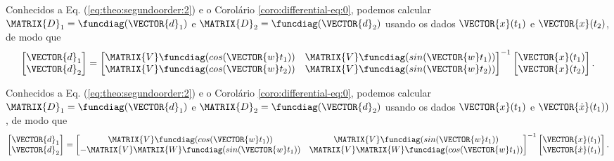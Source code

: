 \begin{corollary}
\label{coro:differential-eq:1}
Conhecidos a Eq. (\ref{eq:theo:segundoorder:2}) e o Corolário \ref{coro:differential-eq:0},
podemos calcular
$\MATRIX{D}_1=\funcdiag(\VECTOR{d}_1)$ e $\MATRIX{D}_2=\funcdiag(\VECTOR{d}_2)$ 
usando os dados $\VECTOR{x}(t_1)$ e $\VECTOR{x}(t_2)$, de modo que
\begin{equation}\label{eq:coro:differential-eq:1:a}
\begin{bmatrix}
\VECTOR{d}_1\\
\VECTOR{d}_2
\end{bmatrix}
=
\begin{bmatrix}
\MATRIX{V} \funcdiag(cos(\VECTOR{w}t_1)) &  \MATRIX{V} \funcdiag(sin(\VECTOR{w}t_1))\\
\MATRIX{V} \funcdiag(cos(\VECTOR{w}t_2)) &  \MATRIX{V} \funcdiag(sin(\VECTOR{w}t_2))
\end{bmatrix}^{-1}
\begin{bmatrix}
\VECTOR{x}(t_1)\\
\VECTOR{x}(t_2)
\end{bmatrix}.
\end{equation}
\end{corollary}

\begin{corollary}
\label{coro:differential-eq:2}
Conhecidos a Eq. (\ref{eq:theo:segundoorder:2}) e o Corolário \ref{coro:differential-eq:0},
podemos calcular
$\MATRIX{D}_1=\funcdiag(\VECTOR{d}_1)$ e $\MATRIX{D}_2=\funcdiag(\VECTOR{d}_2)$ 
usando os dados $\VECTOR{x}(t_1)$ e $\VECTOR{\dot{x}}(t_1))$, de modo que
\begin{equation}\label{eq:coro:differential-eq:2:1}
\begin{bmatrix}
\VECTOR{d}_1\\
\VECTOR{d}_2
\end{bmatrix}
=
\begin{bmatrix}
\MATRIX{V} \funcdiag(cos(\VECTOR{w}t_1)) &  \MATRIX{V} \funcdiag(sin(\VECTOR{w}t_1))\\
-\MATRIX{V}\MATRIX{W} \funcdiag(sin(\VECTOR{w}t_1)) &  \MATRIX{V}\MATRIX{W}\funcdiag(cos(\VECTOR{w}t_1))
\end{bmatrix}^{-1}
\begin{bmatrix}
\VECTOR{x}(t_1)\\
\VECTOR{\dot{x}}(t_1)
\end{bmatrix}.
\end{equation}
\end{corollary}

